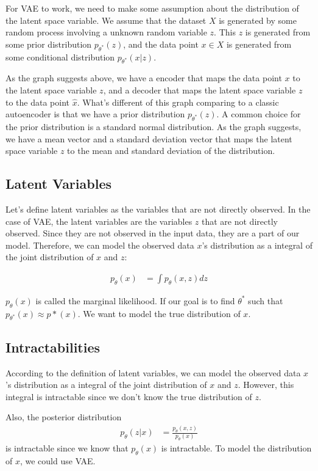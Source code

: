 \documentclass[11pt]{article}
\theoremstyle{definition}
\begin{document}
For VAE to work, we need to make some assumption about the distribution of the latent space variable. We assume that the dataset $X$ is generated by some random process involving a unknown random variable $z$. This $z$ is generated from some prior distribution $p_{\theta^*}(z)$, and the data point $x \in X$ is generated from some conditional distribution $p_{\theta^*}(x|z)$. 

As the graph suggests above, we have a encoder that maps the data point $x$ to the latent space variable $z$, and a decoder that maps the latent space variable $z$ to the data point $\hat{x}$. What's different of this graph comparing to a classic autoencoder is that we have a prior distribution $p_{\theta^*}(z)$. A common choice for the prior distribution is a standard normal distribution. As the graph suggests, we have a mean vector and a standard deviation vector that maps the latent space variable $z$ to the mean and standard deviation of the distribution.

\subsection{Latent Variables}

Let's define latent variables as the variables that are not directly observed. In the case of VAE, the latent variables are the variables $z$ that are not directly observed. Since they are not observed in the input data, they are a part of our model. Therefore, we can model the observed data $x$'s distribution as a integral of the joint distribution of $x$ and $z$:

\begin{align}
    p_\theta(x) &= \int p_\theta(x, z) dz
\end{align}

$p_\theta(x)$ is called the marginal likelihood. If our goal is to find $\theta^*$ such that $p_{\theta^*}(x) \approx p*(x)$. We want to model the true distribution of $x$. 

\subsection{Intractabilities}

According to the definition of latent variables, we can model the observed data $x$'s distribution as a integral of the joint distribution of $x$ and $z$. However, this integral is intractable since we don't know the true distribution of $z$. 

Also, the posterior distribution 
\begin{align}
    p_\theta(z|x) &= \frac{p_\theta(x, z)}{p_\theta(x)}
\end{align}
is intractable since we know that $p_\theta(x)$ is intractable. To model the distribution of $x$, we could use VAE.
\end{document}
